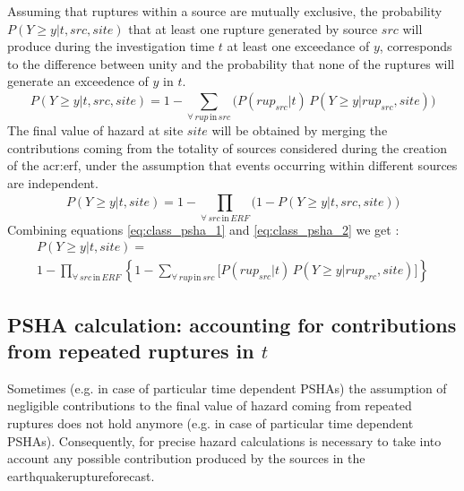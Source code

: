 Assuming that ruptures within a source are mutually exclusive, 
the probability $P(Y\geq y|t,src,site)$ that at least one rupture 
generated by source $src$ will produce during the investigation 
time $t$ at least one exceedance of $y$, corresponds to the 
difference between unity and the probability that none of the 
ruptures will generate an exceedence of $y$ in $t$.
\begin{equation}
P(Y\geq y|t,src,site) = 1 - \sum_{\forall\,rup\,\text{in}\,src}^{} 
	\Big( P(rup_{src}|t)\,
	P(Y\geq y|rup_{src},site) \Big)
\label{eq:class_psha_1}
\end{equation}
The final value of hazard at site $site$ will be obtained by 
merging the contributions coming from the totality of sources 
considered during the creation of the \gls{acr:erf}, under the 
assumption that events occurring within different sources are 
independent.
%
\begin{equation}
P(Y \geq y|t,site) = 1 - \prod_{\forall\,src\,\text{in}\,ERF}^{} 
\Big( 1-P(Y\geq y|t,src,site) \Big) \label{eq:class_psha_2}
\end{equation}
%
Combining equations \ref{eq:class_psha_1} and \ref{eq:class_psha_2} 
we get \cite[see also][equation 4, page 410]{field2003}:
%
\begin{multline}
P(Y \geq y|t,site) = \\
	1-\prod\limits_{\forall\,src\,\text{in}\,ERF}^{}  
	\left\{
		1-\sum\limits_{\forall\,rup\,\text{in}\,src}^{} 
			\biggl[ P(rup_{src}|t)\,P(Y\geq y|rup_{src},site)
			\biggr]
	\right\}
\label{eq:PSHA_calc_classical_no_repeating}
\end{multline}
%
\subsection{PSHA calculation: accounting for contributions from 
repeated ruptures in $t$}
%
Sometimes  (e.g. in case of particular time dependent PSHAs) the 
assumption of negligible contributions to the final value 
of hazard coming from repeated ruptures does not hold anymore (e.g. in 
case of particular time dependent PSHAs). 
%
Consequently, for precise hazard calculations is necessary to take 
into account any possible contribution produced by the sources in the
\gls{earthquakeruptureforecast}.

